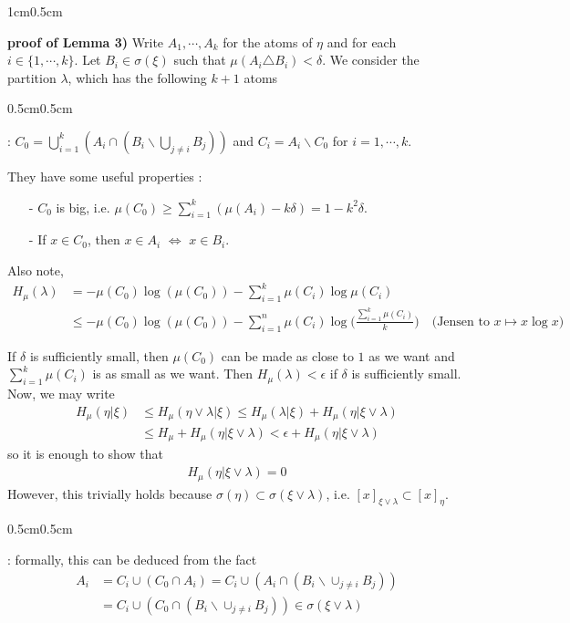 \documentclass[12pt,a4paper]{report}
\newenvironment{proof}
{\begin{changemargin}{1cm}{0.5cm} 
	}%
	{\end{changemargin}
}
\newenvironment{subproof}
{\begin{changemargin}{0.5cm}{0.5cm}
	}%
	{\end{changemargin}
}
\begin{document}
\begin{proof}
\textbf{proof of Lemma 3)} Write $A_1, \cdots, A_k$ for the atoms of $\eta$ and for each $i \in \{1,\cdots, k\}$. Let $B_i \in \sigma(\xi)$ such that $\mu(A_i \triangle B_i) < \delta$. We consider the partition $\lambda$, which has the following $k+1$ atoms
\begin{subproof}
: $C_0 = \bigcup_{i=1}^k (A_i \cap (B_i \backslash \bigcup_{j\neq i} B_j ) )$ and $C_i = A_i \backslash C_0$ for $i=1, \cdots, k$.

They have some useful properties :
\begin{itemize}
\item[-] $C_{0}$ is big, i.e. $\mu(C_0) \geq \sum_{i=1}^k (\mu(A_i) - k\delta) = 1-k^2 \delta$.
\item[-] If $x\in C_0$, then $x\in A_i$ $\Leftrightarrow$ $x\in B_i$.
\end{itemize}
Also note, 
\begin{align*}
H_{\mu} (\lambda) &= -\mu(C_0) \log (\mu(C_0)) - \sum_{i=1}^k \mu(C_i) \log \mu (C_i) \\
&\leq -\mu(C_0) \log (\mu (C_0)) - \sum_{i=1}^n \mu(C_i) \log \Big( \frac{\sum_{i=1}^k \mu(C_i)}{k} \Big) \quad \text{(Jensen to }x\mapsto x\log x) 
\end{align*}
\end{subproof}
If $\delta$ is sufficiently small, then $\mu(C_0)$ can be made as close to $1$ as we want and $\sum_{i=1}^k \mu(C_i)$ is as small as we want. Then
$H_{\mu}(\lambda) < \epsilon$ if $\delta$ is sufficiently small. Now, we may write
\begin{align*}
H_{\mu}(\eta | \xi) &\leq H_{\mu}(\eta \vee \lambda | \xi) \leq H_{\mu}(\lambda | \xi) + H_{\mu}(\eta | \xi \vee \lambda) \\
& \leq H_{\mu} + H_{\mu}(\eta | \xi \vee \lambda) < \epsilon + H_{\mu}(\eta | \xi \vee \lambda)
\end{align*}
so it is enough to show that
\begin{align*}
H_{\mu}(\eta | \xi \vee \lambda) =0
\end{align*}
However, this trivially holds because $\sigma (\eta) \subset \sigma(\xi \vee \lambda)$, i.e. $[x]_{\xi \vee \lambda} \subset [x]_{\eta}$.
\begin{subproof}
: formally, this can be deduced from the fact \begin{align*}
A_i &= C_i \cup (C_0 \cap A_i) = C_i \cup (A_i \cap (B_i \backslash \cup_{j\neq i} B_j)) \\
&= C_i \cup (C_0 \cap (B_i \backslash \cup_{j\neq i} B_j)) \in \sigma(\xi \vee \lambda)
\end{align*}
\end{subproof}

\eop
\end{proof}
\s
\end{document}
